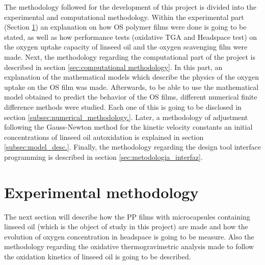 \begin{refsection}

The methodology followed for the development of this project is divided into the experimental and computational methodology. Within the experimental part (Section \ref{sec:exp_methodology}) an explanation on how OS polymer films were done is going to be stated, as well as how performance tests (oxidative TGA and Headspace test) on the oxygen uptake capacity of linseed oil and the oxygen scavenging film were made. Next, the methodology regarding the computational part of the project is described in section \ref{sec:computational methodology}. In this part, an explanation of the mathematical models which describe the physics of the oxygen uptake on the OS film was made. Afterwards, to be able to use the mathematical model obtained to predict the behavior of the OS films, different numerical finite difference methods were studied. Each one of this is going to be disclosed in section \ref{subsec:numerical_methodology.}. Later, a methodology of adjustment following the Gauss-Newton method for the kinetic velocity constants an initial concentrations of linseed oil autoxidation is explained in section \ref{subsec:model_desc.}. Finally, the methodology regarding the design tool interface programming is described in section \ref{sec:metodologia_interfaz}. 
 

\section{Experimental methodology}\label{sec:exp_methodology}
The next section will describe how the PP films with microcapsules containing linseed oil (which is the object of study in this project) are made and how the evolution of oxygen concentration in headspace is going to be measure. Also the methodology regarding the oxidative thermogravimetric analysis made to follow the oxidation kinetics of linseed oil is going to be described. 


\end{refsection}
